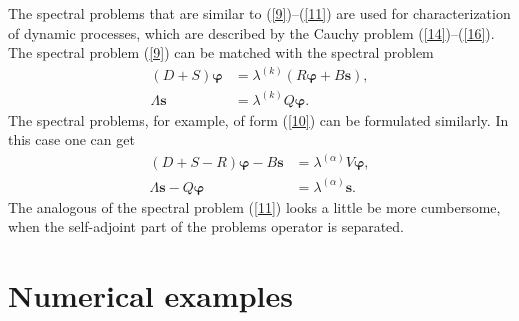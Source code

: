 \documentclass[authoryear]{elsarticle}
\begin{document}
The spectral problems that are similar to (\ref{9})--(\ref{11}) are used for characterization of dynamic processes, which are described by the Cauchy problem (\ref{14})--(\ref{16}). The spectral problem (\ref{9}) can be matched with the spectral problem
\[
\begin{split}
 (D+S) \bm \varphi  & = \lambda^{(k)} \left ( R \bm \varphi  +  B \bm s \right ) , \\
 \Lambda \bm s & =  \lambda^{(k)} Q \bm \varphi .
\end{split}
\] 
The spectral problems, for example, of form (\ref{10}) can be formulated similarly. In this case one can get 
\[
\begin{split}
 (D+S - R) \bm \varphi  -  B \bm s & = \lambda^{(\alpha)} V \bm \varphi , \\
 \Lambda \bm s - Q \bm \varphi & =  \lambda^{(\alpha)}   \bm s .
\end{split}
\]
The analogous of the spectral problem (\ref{11}) looks a little be more cumbersome, when the self-adjoint part of the problems operator is separated. 

\section{Numerical examples} 
\end{document}
